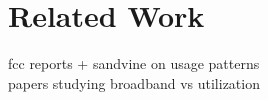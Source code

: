 \section{Related Work}
fcc reports + sandvine on usage patterns\\
papers studying broadband vs utilization\\
